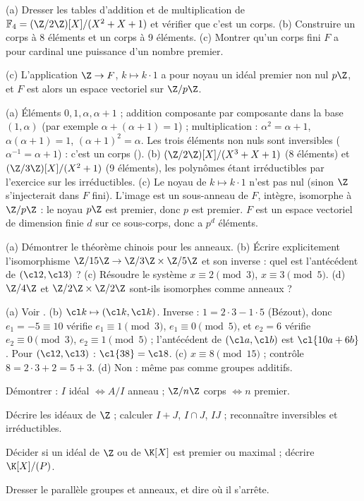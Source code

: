\begin{exo}
(a) Dresser les tables d'addition et de multiplication de $\mathbb F_4=(\Z/2\Z)[X]/(X^2+X+1)$ et vérifier que c'est un corps. (b) Construire un corps à 8 éléments et un corps à 9 éléments. (c) Montrer qu'un corps fini $F$ a pour cardinal une puissance d'un nombre premier.
\begin{indication}
(c) L'application $\Z\to F$, $k\mapsto k\cdot1$ a pour noyau un idéal premier non nul $p\Z$, et $F$ est alors un espace vectoriel sur $\Z/p\Z$.
\end{indication}
\begin{corrige}
(a) Éléments $0,1,\alpha,\alpha+1$ ; addition composante par composante dans la base $(1,\alpha)$ (par exemple $\alpha+(\alpha+1)=1$) ; multiplication : $\alpha^2=\alpha+1$, $\alpha(\alpha+1)=1$, $(\alpha+1)^2=\alpha$. Les trois éléments non nuls sont inversibles ($\alpha^{-1}=\alpha+1$) : c'est un corps ().
(b) $(\Z/2\Z)[X]/(X^3+X+1)$ (8 éléments) et $(\Z/3\Z)[X]/(X^2+1)$ (9 éléments), les polynômes étant irréductibles par l'exercice sur les irréductibles.
(c) Le noyau de $k\mapsto k\cdot1$ n'est pas nul (sinon $\Z$ s'injecterait dans $F$ fini). L'image est un sous-anneau de $F$, intègre, isomorphe à $\Z/p\Z$ : le noyau $p\Z$ est premier, donc $p$ est premier. $F$ est un espace vectoriel de dimension finie $d$ sur ce sous-corps, donc a $p^d$ éléments.
\end{corrige}
\end{exo}
\begin{exo}
(a) Démontrer le théorème chinois pour les anneaux. (b) Écrire explicitement l'isomorphisme $\Z/15\Z\to\Z/3\Z\times\Z/5\Z$ et son inverse : quel est l'antécédent de $(\cl2,\cl3)$ ? (c) Résoudre le système $x\equiv2\pmod3$, $x\equiv3\pmod5$. (d) $\Z/4\Z$ et $\Z/2\Z\times\Z/2\Z$ sont-ils isomorphes comme anneaux ?
\begin{corrige}
(a) Voir . (b) $\cl k\mapsto(\cl k,\cl k)$. Inverse : $1=2\cdot3-1\cdot5$ (Bézout), donc $e_1=-5\equiv10$ vérifie $e_1\equiv1\pmod3$, $e_1\equiv0\pmod5$, et $e_2=6$ vérifie $e_2\equiv0\pmod3$, $e_2\equiv1\pmod5$ ; l'antécédent de $(\cl a,\cl b)$ est $\cl{10a+6b}$. Pour $(\cl2,\cl3)$ : $\cl{38}=\cl8$. (c) $x\equiv8\pmod{15}$ ; contrôle $8=2\cdot3+2=5+3$. (d) Non : même pas comme groupes additifs.
\end{corrige}
\end{exo}

\begin{bilan}
\item Démontrer : $I$ idéal $\iff A/I$ anneau ; $\Z/n\Z$ corps $\iff n$ premier.
\item Décrire les idéaux de $\Z$ ; calculer $I+J$, $I\cap J$, $IJ$ ; reconnaître inversibles et irréductibles.
\item Décider si un idéal de $\Z$ ou de $\K[X]$ est premier ou maximal ; décrire $\K[X]/(P)$.
\item Dresser le parallèle groupes et anneaux, et dire où il s'arrête.
\end{bilan}
